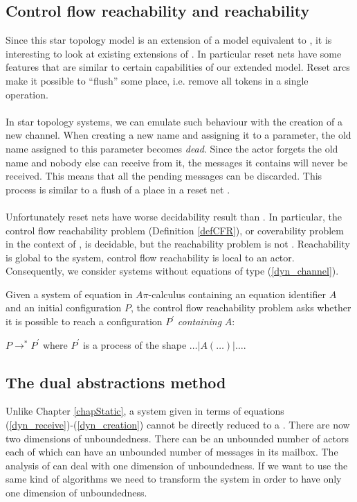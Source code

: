 \documentclass[a4paper]{report}
\numberwithin{algorithm}{chapter}
\begin{document}
\subsection{Control flow reachability and reachability}
Since this star topology model is an extension of a model equivalent to \pns{}, it is interesting to look at existing extensions of \pns{}.
In particular reset nets have some features that are similar to certain capabilities of our extended model.
Reset arcs make it possible to ``flush'' some place, i.e. remove all tokens in a single operation.

\paragraph{}
In star topology systems, we can emulate such behaviour with the creation of a new channel.
When creating a new name and assigning it to a parameter, the old name assigned to this parameter becomes \emph{dead}.
Since the actor forgets the old name and nobody else can receive from it, the messages it contains will never be received.
This means that all the pending messages can be discarded.
This process is similar to a flush of a place in a reset net \cite{DBLP:journals/njc/AmadioM02}.

\paragraph{}
Unfortunately reset nets have worse decidability result than \pns{}.
In particular, the control flow reachability problem (Definition \ref{defCFR}), or coverability problem in the context of \pns{}, is decidable, but the reachability problem is not \cite{DBLP:conf/icalp/DufourdFS98}.
Reachability is global to the system, control flow reachability is local to an actor.
Consequently, we consider systems without equations of type (\ref{dyn_channel}).

\begin{define}
\label{defCFR}
Given a system of equation in $A\pi$-calculus containing an equation identifier $A$ and an initial configuration $P$,
the control flow reachability problem asks whether it is possible to reach a configuration $P^\prime$ \emph{containing} $A$:

$P \rightarrow^* P^\prime$ where $P^\prime$ is a process of the shape $\ldots | A(\ldots) | \ldots$.
\end{define}

\subsection{The dual abstractions method}
Unlike Chapter \ref{chapStatic}, a system given in terms of equations (\ref{dyn_receive})-(\ref{dyn_creation}) cannot be directly reduced to a \pn{}.
There are now two dimensions of unboundedness.
There can be an unbounded number of actors each of which can have an unbounded number of messages in its mailbox.
The analysis of \pns{} can deal with one dimension of unboundedness.
If we want to use the same kind of algorithms we need to transform the system in order to have only one dimension of unboundedness.
\end{document}
